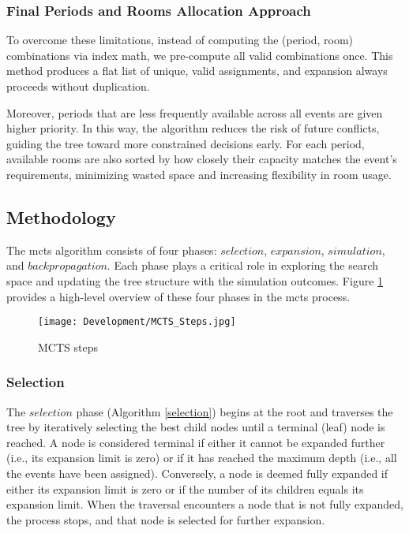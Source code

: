 \subsubsection{Final Periods and Rooms Allocation Approach}

To overcome these limitations, instead of computing the (period, room) combinations via index math, we pre-compute all valid combinations once. This method produces a flat list of unique, valid assignments, and expansion always proceeds without duplication.

Moreover, periods that are less frequently available across all events are given higher priority. In this way, the algorithm reduces the risk of future conflicts, guiding the tree toward more constrained decisions early. For each period, available rooms are also sorted by how closely their capacity matches the event’s requirements, minimizing wasted space and increasing flexibility in room usage.

\subsection{Methodology}

The \ac{mcts} algorithm consists of four phases: \(selection\), \(expansion\), \(simulation\), and \(backpropagation\). Each phase plays a critical role in exploring the search space and updating the tree structure with the simulation outcomes. Figure \ref{fig:mcts_steps} provides a high-level overview of these four phases in the \ac{mcts} process.

\begin{figure}[H]
      \centering
      \texttt{[image: Development/MCTS\_Steps.jpg]}
      \caption[MCTS steps]
      {MCTS steps}
      \label{fig:mcts_steps}
\end{figure}

\subsubsection{Selection}

The \(selection\) phase (Algorithm \ref{selection}) begins at the root and traverses the tree by iteratively selecting the best child nodes until a terminal (leaf) node is reached. A node is considered terminal if either it cannot be expanded further (i.e., its expansion limit is zero) or if it has reached the maximum depth (i.e., all the events have been assigned). Conversely, a node is deemed fully expanded if either its expansion limit is zero or if the number of its children equals its expansion limit. When the traversal encounters a node that is not fully expanded, the process stops, and that node is selected for further expansion.

